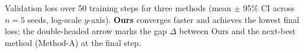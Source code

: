 \caption{Validation loss over 50 training steps for three methods (mean $\pm$ 95\% CI across $n{=}5$ seeds, log-scale $y$-axis). \textbf{Ours} converges faster and achieves the lowest final loss; the double-headed arrow marks the gap $\Delta$ between Ours and the next-best method (Method-A) at the final step.}
